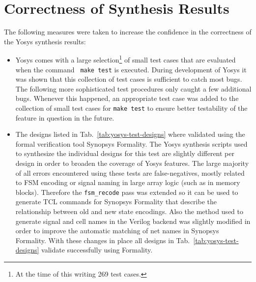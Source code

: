 
\section{Correctness of Synthesis Results}

The following measures were taken to increase the confidence in the correctness of the Yosys synthesis results:

\begin{itemize}
\item Yosys comes with a large selection\footnote{At the time of this writing
269 test cases.} of small test cases that are evaluated when the command {\tt
make test} is executed. During development of Yosys it was shown that this
collection of test cases is sufficient to catch most bugs. The following more
sophisticated test procedures only caught a few additional bugs. Whenever this
happened, an appropriate test case was added to the collection of small test
cases for {\tt make test} to ensure better testability of the feature in
question in the future.

\item The designs listed in Tab.~\ref{tab:yosys-test-designs} where validated
using the formal verification tool Synopsys Formality.
The Yosys synthesis scripts used to synthesize the individual designs for this
test are slightly different per design in order to broaden the coverage of
Yosys features. The large majority of all errors encountered using these tests
are false-negatives, mostly related to FSM encoding or signal naming in large
array logic (such as in memory blocks). Therefore the {\tt fsm\_recode} pass
was extended so it can be used to generate TCL commands for Synopsys Formality
that describe the relationship between old and new state encodings. Also the
method used to generate signal and cell names in the Verilog backend was
slightly modified in order to improve the automatic matching of net names in
Synopsys Formality. With these changes in place all designs in Tab.~\ref{tab:yosys-test-designs}
validate successfully using Formality.


\end{itemize}
